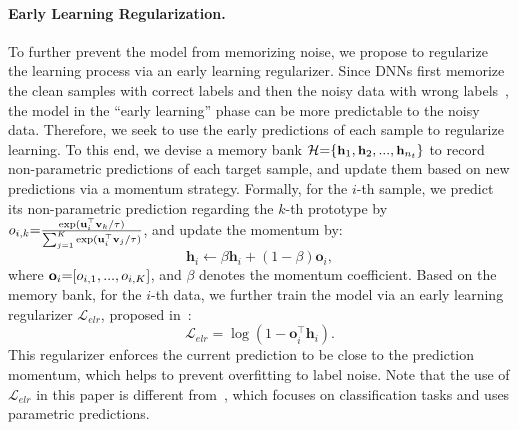 \documentclass{article}
\begin{document}
\paragraph{Early Learning Regularization.}
\label{sec:lreg} 
To further prevent the model from memorizing noise, we propose to regularize the learning process via an early learning regularizer. Since DNNs first memorize the clean samples with correct labels and then the noisy data with wrong labels~\cite{arpit2017closer}, the model in the “early learning” phase can be more predictable to the noisy data. Therefore, we seek to use the early predictions of each sample to regularize learning.
To this end, we devise a memory bank $\mathcal{H}\small{=}\{\textbf{h}_{1}, \textbf{h}_{2},...,\textbf{h}_{n_t}\}$ to record non-parametric predictions of each target sample, and update them based on new predictions via a momentum strategy. Formally, for the $i$-th sample, we predict its non-parametric prediction regarding the $k$-th prototype by  
$o_{i,k} \small{=} \frac{\exp(\textbf{u}_{i}^{\top}\textbf{v}_k/\tau)}{\sum_{j=1}^{K}\exp(\textbf{u}_{i}^{\top} \textbf{v}_{j}/\tau)}$,
and update the momentum by:
\begin{equation}
\textbf{h}_{i} \xleftarrow{} \beta \textbf{h}_{i} + (1-\beta)\textbf{o}_{i}, 
\end{equation}
where $\textbf{o}_{i}\small{=}[o_{i,1},...,o_{i,K}]$, and $\beta$ denotes the momentum coefficient. Based on the memory bank, for the $i$-th data, we further train the model via  an early learning regularizer $\mathcal{L}_{elr}$, proposed in~\cite{liu2020early}:
\begin{equation}
\label{loss:reg}
\mathcal{L}_{elr} = \log(1-\textbf{o}_{i}^{\top} \textbf{h}_{i}).
\end{equation}
This regularizer enforces the current prediction to be close to the prediction momentum, which helps to prevent overfitting to label noise. Note that the use of $\mathcal{L}_{elr}$ in this paper is different from~\cite{liu2020early}, which focuses on classification tasks and uses parametric predictions.

 
\end{document}
